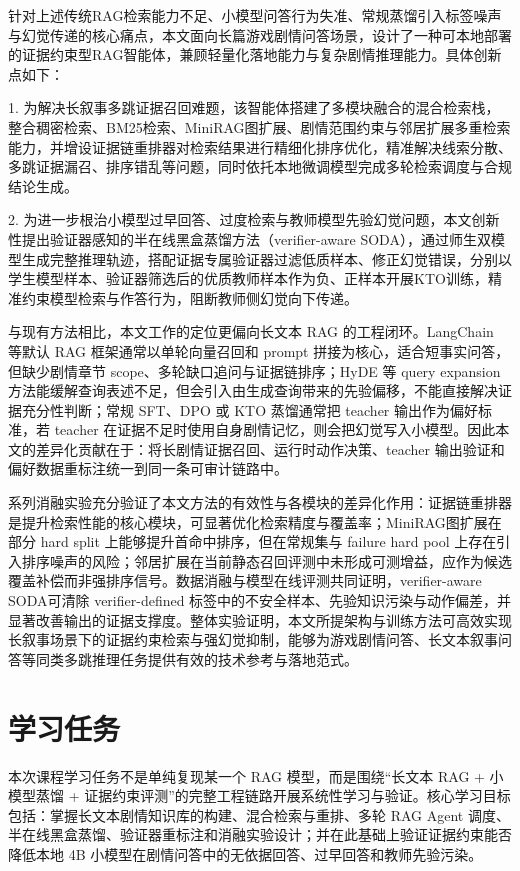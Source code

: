 \documentclass[UTF8,a4paper,12pt]{ctexart}
\begin{document}
针对上述传统RAG检索能力不足、小模型问答行为失准、常规蒸馏引入标签噪声与幻觉传递的核心痛点，本文面向长篇游戏剧情问答场景，设计了一种可本地部署的证据约束型RAG智能体，兼顾轻量化落地能力与复杂剧情推理能力。具体创新点如下：

1. 为解决长叙事多跳证据召回难题，该智能体搭建了多模块融合的混合检索栈，整合稠密检索、BM25检索、MiniRAG图扩展、剧情范围约束与邻居扩展多重检索能力，并增设证据链重排器对检索结果进行精细化排序优化，精准解决线索分散、多跳证据漏召、排序错乱等问题，同时依托本地微调模型完成多轮检索调度与合规结论生成。

2. 为进一步根治小模型过早回答、过度检索与教师模型先验幻觉问题，本文创新性提出验证器感知的半在线黑盒蒸馏方法（verifier-aware SODA），通过师生双模型生成完整推理轨迹，搭配证据专属验证器过滤低质样本、修正幻觉错误，分别以学生模型样本、验证器筛选后的优质教师样本作为负、正样本开展KTO训练，精准约束模型检索与作答行为，阻断教师侧幻觉向下传递。

与现有方法相比，本文工作的定位更偏向长文本 RAG 的工程闭环。LangChain 等默认 RAG 框架通常以单轮向量召回和 prompt 拼接为核心，适合短事实问答，但缺少剧情章节 scope、多轮缺口追问与证据链排序；HyDE 等 query expansion 方法能缓解查询表述不足，但会引入由生成查询带来的先验偏移，不能直接解决证据充分性判断；常规 SFT、DPO 或 KTO 蒸馏通常把 teacher 输出作为偏好标准，若 teacher 在证据不足时使用自身剧情记忆，则会把幻觉写入小模型。因此本文的差异化贡献在于：将长剧情证据召回、运行时动作决策、teacher 输出验证和偏好数据重标注统一到同一条可审计链路中。

系列消融实验充分验证了本文方法的有效性与各模块的差异化作用：证据链重排器是提升检索性能的核心模块，可显著优化检索精度与覆盖率；MiniRAG图扩展在部分 hard split 上能够提升首命中排序，但在常规集与 failure hard pool 上存在引入排序噪声的风险；邻居扩展在当前静态召回评测中未形成可测增益，应作为候选覆盖补偿而非强排序信号。数据消融与模型在线评测共同证明，verifier-aware SODA可清除 verifier-defined 标签中的不安全样本、先验知识污染与动作偏差，并显著改善输出的证据支撑度。整体实验证明，本文所提架构与训练方法可高效实现长叙事场景下的证据约束检索与强幻觉抑制，能够为游戏剧情问答、长文本叙事问答等同类多跳推理任务提供有效的技术参考与落地范式。

\section{学习任务}

本次课程学习任务不是单纯复现某一个 RAG 模型，而是围绕“长文本 RAG + 小模型蒸馏 + 证据约束评测”的完整工程链路开展系统性学习与验证。核心学习目标包括：掌握长文本剧情知识库的构建、混合检索与重排、多轮 RAG Agent 调度、半在线黑盒蒸馏、验证器重标注和消融实验设计；并在此基础上验证证据约束能否降低本地 4B 小模型在剧情问答中的无依据回答、过早回答和教师先验污染。
\end{document}

